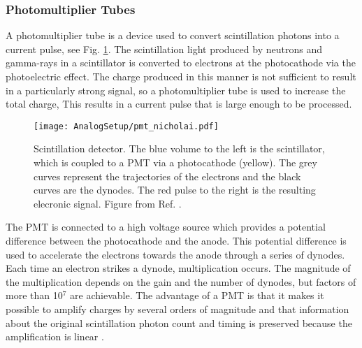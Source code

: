 \documentclass[main.tex]{subfiles}
\begin{document}
\subsubsection{Photomultiplier Tubes}
A photomultiplier tube is a device used to convert scintillation photons into a current pulse, see Fig. \ref{fig:pmt}. The scintillation light produced by neutrons and gamma-rays in a scintillator is converted to electrons at the photocathode via the photoelectric effect. The charge produced in this manner is not sufficient to result in a particularly strong signal, so a photomultiplier tube is used to increase the total charge, This results in a current pulse that is large enough to be processed. 

\begin{figure}[ht]
	\centering
    	\texttt{[image: AnalogSetup/pmt\_nicholai.pdf]}
        \caption[Scintillation detector]{Scintillation detector. The blue volume to the left is the scintillator, which is coupled to a PMT via a photocathode (yellow). The grey curves represent the trajectories of the electrons and the black curves are the dynodes. The red pulse to the right is the resulting elecronic signal. Figure from Ref. \cite{Mauritzsson}.}
	    \label{fig:pmt} 
\end{figure}

The PMT is connected to a high voltage source which provides a potential difference between the photocathode and the anode. This potential difference is used to accelerate the electrons towards the anode through a series of dynodes. Each time an electron strikes a dynode, multiplication occurs. 
The magnitude of the multiplication depends on the gain and the number of dynodes, but factors of more than 10$^\text{7}$ are achievable. 
The advantage of a PMT is that it makes it possible to amplify charges by several orders of magnitude and that information about the original scintillation photon count and timing is preserved because the amplification is linear \cite{Leo}.
\end{document}
